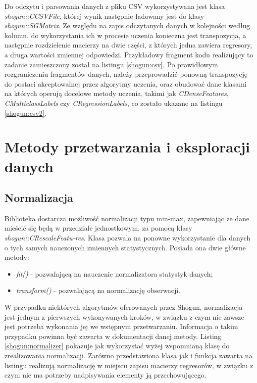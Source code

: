 Do odczytu i parsowania danych z pliku CSV wykorzystywana jest klasa \textit{shogun::CCSVFile}, której wynik następnie ładowany jest do klasy \textit{shogun::SGMatrix}. Ze względu na zapis odczytanych danych w kolejności według kolumn. do wykorzystania ich w procesie uczenia konieczna jest transpozycja, a następnie rozdzielenie macierzy na dwie części, z których jedna zawiera regresory, a druga wartości zmiennej odpowiedzi. Przykładowy fragment kodu realizujący to zadanie zamieszczony został na listingu \ref{shogun:csv}. Po prawidłowym rozgraniczeniu fragmentów danych, należy przeprowadzić ponowną transpozycję do postaci akceptowalnej przez algorytmy uczenia, oraz obudować dane klasami na których operują docelowe metody uczenia, takimi jak \textit{CDenseFeatures}, \textit{CMulticlassLabels} czy \textit{CRegressionLabels}, co zostało ukazane na listingu \ref{shogun:csv2}.



\section{Metody przetwarzania i eksploracji danych}

\subsection{Normalizacja}

     
Biblioteka dostarcza możliwość normalizacji typu min-max, zapewniając że dane mieścić się będą w przedziale jednostkowym, za pomocą klasy \textit{shogun::CRescaleFeatu-res}. Klasa pozwala na ponowne wykorzystanie dla danych o tych samych nauczonych zmiennych statystycznych. Posiada ona dwie główne metody:

\begin{itemize}
	\item \textit{fit()} - pozwalającą na nauczenie normalizatora statystyk danych;
	\item \textit{transform()} - pozwalającą na normalizację obserwacji.
\end{itemize}

W przypadku niektórych algorytmów oferowanych przez Shogun, normalizacja jest jednym z pierwszych wykonywanych kroków, w związku z czym nie zawsze jest potrzeba wykonania jej we wstępnym przetwarzaniu. Informacja o takim przypadku powinna być zawarta w dokumentacji danej metody. Listing \ref{shogun:normalizer} pokazuje jak wykorzystać wyżej wspomnianą klasę do zrealizowania normalizacji. Zarówno przedstawiona klasa jak i funkcja zawarta na listingu realizują normalizację w miejscu zapisu macierzy regresorów, w związku z czym nie ma potrzeby nadpisywania elementy ją przechowującego.

